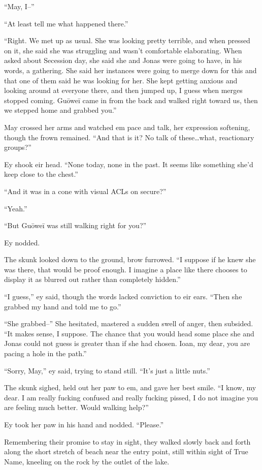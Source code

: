 ``May, I--''

``At least tell me what happened there.''

``Right. We met up as usual. She was looking pretty terrible, and when pressed on it, she said she was struggling and wasn't comfortable elaborating. When asked about Secession day, she said she and Jonas were going to have, in his words, a gathering. She said her instances were going to merge down for this and that one of them said he was looking for her. She kept getting anxious and looking around at everyone there, and then jumped up, I guess when merges stopped coming. Guōweī came in from the back and walked right toward us, then we stepped home and grabbed you.''

May crossed her arms and watched em pace and talk, her expression softening, though the frown remained. ``And that is it? No talk of these\ldots what, reactionary groups?''

Ey shook eir head. ``None today, none in the past. It seems like something she'd keep close to the chest.''

``And it was in a cone with visual ACLs on secure?''

``Yeah.''

``But Guōweī was still walking right for you?''

Ey nodded.

The skunk looked down to the ground, brow furrowed. ``I suppose if he knew she was there, that would be proof enough. I imagine a place like there chooses to display it as blurred out rather than completely hidden.''

``I guess,'' ey said, though the words lacked conviction to eir ears. ``Then she grabbed my hand and told me to go.''

``She grabbed--'' She hesitated, mastered a sudden swell of anger, then subsided. ``It makes sense, I suppose. The chance that you would head some place she and Jonas could not guess is greater than if she had chosen. Ioan, my dear, you are pacing a hole in the path.''

``Sorry, May,'' ey said, trying to stand still. ``It's just a little nuts.''

The skunk sighed, held out her paw to em, and gave her best smile. ``I know, my dear. I am really fucking confused and really fucking pissed, I do not imagine you are feeling much better. Would walking help?''

Ey took her paw in his hand and nodded. ``Please.''

Remembering their promise to stay in sight, they walked slowly back and forth along the short stretch of beach near the entry point, still within sight of True Name, kneeling on the rock by the outlet of the lake.

